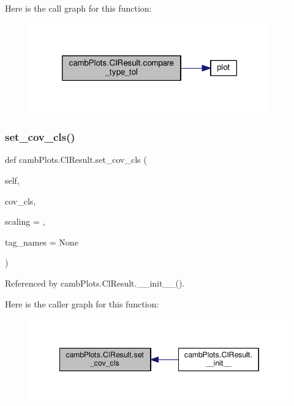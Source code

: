 Here is the call graph for this function\+:
\nopagebreak
\begin{figure}[H]
\begin{center}
\leavevmode
\includegraphics[width=294pt]{classcambPlots_1_1ClResult_aaffae6fc9084e491c64e5ae37dfd9cec_cgraph}
\end{center}
\end{figure}
\mbox{\label{classcambPlots_1_1ClResult_a5c7be3ff40c99aba49a78c320dfc3a50}} 
\subsubsection{\texorpdfstring{set\+\_\+cov\+\_\+cls()}{set\_cov\_cls()}}
{\footnotesize\ttfamily def camb\+Plots.\+Cl\+Result.\+set\+\_\+cov\+\_\+cls (\begin{DoxyParamCaption}\item[{}]{self,  }\item[{}]{cov\+\_\+cls,  }\item[{}]{scaling = {},  }\item[{}]{tag\+\_\+names = {\ttfamily None} }\end{DoxyParamCaption})}



Referenced by camb\+Plots.\+Cl\+Result.\+\_\+\+\_\+init\+\_\+\+\_\+().

Here is the caller graph for this function\+:
\nopagebreak
\begin{figure}[H]
\begin{center}
\leavevmode
\includegraphics[width=346pt]{classcambPlots_1_1ClResult_a5c7be3ff40c99aba49a78c320dfc3a50_icgraph}
\end{center}
\end{figure}
\mbox{\label{classcambPlots_1_1ClResult_a274c3abd74f9d6bc3a2a94428abce3a0}} 
